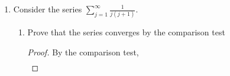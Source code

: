 \documentclass{article}
\begin{document}
\begin{enumerate}
\begin{enumerate}
                        \begin{proof}[Converges.]
                              By the comparison test,
                              \begin{align*}
                                    e^{-j+\sin j} & = \frac{e^{\sin j}}{e^j} \\
                                                  & \leq \frac{e}{e^j}
                              \end{align*}
                              and
                              \begin{align*}
                                    \sum \frac{e}{e^j} & = e\sum \frac{1}{e^j}               \\
                                                       & = e\sum \left(\frac{1}{e}\right)^j.
                              \end{align*}
                              This is a power series, which converges because the power term is less than 1.
                              Therefore, the series converges.
                        \end{proof}
                  \item $\sum\frac{j+\cos j}{j}$
                        \begin{proof}[Diverges.]
                              It is clear that
                              \begin{align*}
                                    \sum\frac{j+\cos j}{j} & = \sum\left(\frac{j}{j} + \frac{\cos j}{j}\right) \\
                                                           & = \sum(1) + \sum\left(\frac{\cos j}{j}\right).
                              \end{align*}
                              Without a doubt, $\sum(1)$ is divergent and therefore the series is divergent.
                        \end{proof}
            \end{enumerate}
            \setcounter{enumi}{3}
      \item Consider the series $\sum_{j=1}^\infty\frac{1}{j(j+1)}$.
            \begin{enumerate}
                  \item Prove that the series converges by the
                        comparison test
                        \begin{proof}
                              By the comparison test,
                              \begin{align*}

\end{align*}
\end{proof}
\end{enumerate}
\end{enumerate}
\end{document}
